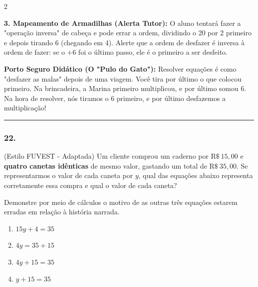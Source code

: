 \begin{multicols*}{2}
\begin{tcolorbox}[colback=CorTitUm!5, colframe=CorTitUm, boxrule=1pt, arc=4pt, left=6pt, right=6pt, top=6pt, bottom=6pt]
    \textbf{3. Mapeamento de Armadilhas (Alerta Tutor):} O aluno tentará fazer a "operação inversa" de cabeça e pode errar a ordem, dividindo o 20 por 2 primeiro e depois tirando 6 (chegando em 4). Alerte que a ordem de desfazer é inversa à ordem de fazer: se o $+6$ foi o último passo, ele é o primeiro a ser desfeito.
    \end{tcolorbox}
    \vspace{0.15cm}
    
    \begin{boxexplicacao}
    \textbf{Porto Seguro Didático (O "Pulo do Gato"):} Resolver equações é como "desfazer as malas" depois de uma viagem. Você tira por último o que colocou primeiro. Na brincadeira, a Marina primeiro multiplicou, e por último somou 6. Na hora de resolver, nós tiramos o 6 primeiro, e por último desfazemos a multiplicação!
    \end{boxexplicacao}
\fi

\par\vspace{\espacoQuestao}

\noindent\textcolor{CorLinha}{\rule{\linewidth}{0.5pt}} 
\par\vspace{\espacoPreQuestao}
\subsubsection*{22.} 
\begin{enunciadoLiteral}
(Estilo FUVEST - Adaptada) Um cliente comprou um caderno por $ \text{R\$} \ 15,00 $ e \textbf{quatro canetas idênticas} de mesmo valor, gastando um total de $ \text{R\$} \ 35,00 $. Se representarmos o valor de cada caneta por $y$, qual das equações abaixo representa corretamente essa compra e qual o valor de cada caneta? 

Demonstre por meio de cálculos o motivo de as outras três equações estarem erradas em relação à história narrada.

\begin{enumerate}[label=\alph*), itemsep=\espacoAlt]
    \item $ 15y + 4 = 35 $
    \item $ 4y = 35 + 15 $
    \item $ 4y + 15 = 35 $
    \item $ y + 15 = 35 $
\end{enumerate}
\end{enunciadoLiteral}


\end{multicols*}
